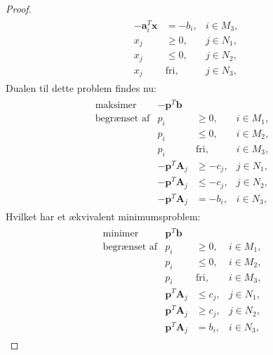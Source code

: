 \begin{proof}
\begin{align*}
\begin{array}{lrll}
					&-\textbf{a}_i^T\textbf{x}	& = -b_i,	&i \in M_3,\\
					&x_j					&\geq 0,	&j \in N_1,\\
					&x_j					&\leq 0,	&j \in N_2,\\							&x_j					&\text{fri},	&j \in N_3,
\end{array}
\end{align*}
Dualen til dette problem findes nu:
\begin{align*}
\begin{array}{lrll}
\text{maksimer}		&-\textbf{p}^T\textbf{b}	&			&\\
\text{begrænset af}	&p_i					&\geq 0,	&i \in M_1,\\
					&p_i					&\leq 0,	&i \in M_2,\\
					&p_i					&\text{fri},	&i \in M_3,\\
					&-\textbf{p}^T\textbf{A}_j	&\geq -c_j,	&j \in N_1,\\
					&-\textbf{p}^T\textbf{A}_j	&\leq -c_j,	&j \in N_2,\\
					&-\textbf{p}^T\textbf{A}_j	& = -b_i,	&i \in N_3,
\end{array}
\end{align*}
Hvilket har et ækvivalent minimumsproblem:
\begin{align*}
\begin{array}{lrll}
\text{minimer}		&\textbf{p}^T\textbf{b}	&			&\\
\text{begrænset af}	&p_i					&\geq 0,	&i \in M_1,\\
					&p_i					&\leq 0,	&i \in M_2,\\
					&p_i					&\text{fri},	&i \in M_3,\\
					&\textbf{p}^T\textbf{A}_j	&\leq c_j,	&j \in N_1,\\
					&\textbf{p}^T\textbf{A}_j	&\geq c_j,	&j \in N_2,\\
					&\textbf{p}^T\textbf{A}_j	& = b_i,	&i \in N_3,
\end{array}
\end{align*}
\end{proof}
%
